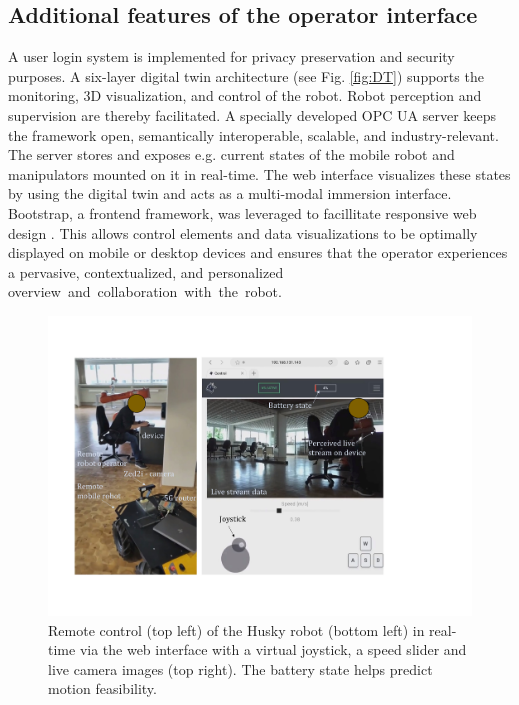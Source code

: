 \documentclass[letterpaper, 10 pt, conference]{ieeeconf}  %
\begin{document}
\subsection{Additional features of the operator interface }
A user login system is implemented for privacy preservation  and security purposes. A six-layer digital twin architecture (see Fig. \ref{fig:DT}) supports the monitoring, 3D visualization, and control of the robot. Robot perception and supervision are thereby facilitated. 
A specially developed OPC UA server  keeps the framework open, semantically interoperable, scalable, and industry-relevant. The server stores and exposes e.g. current states of the mobile robot and manipulators  mounted on it in real-time. 
The web interface visualizes these states by using the digital twin and acts as a multi-modal immersion interface. Bootstrap, a frontend framework, was leveraged to facillitate responsive web design \cite{bootstrap}. 
This allows control elements and data visualizations to be optimally displayed on mobile or desktop devices and ensures that the operator experiences a pervasive, contextualized, and personalized \mbox{overview and collaboration with the robot.}

\begin{figure}[t]
	\centerline{\includegraphics[width=\columnwidth]{images/telehusky.pdf}}
	\caption{Remote control (top left) of the Husky robot (bottom left) in real-time via the web interface with a virtual joystick, a speed slider and  live camera images (top right). The battery state helps predict motion feasibility.}
	\label{fig:clip}
\end{figure}
\end{document}
